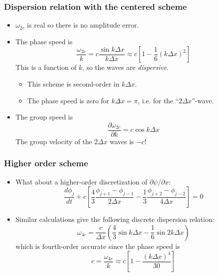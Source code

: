 \documentclass[aspectratio=43,9pt]{beamer}
\begin{document}
%
%
\begin{frame}
	\frametitle{Dispersion relation with the centered scheme}
	\vfill\begin{itemize}
		\item $\omega_{2c}$ is real so there is no amplitude error.\vfill
		\item The phase speed is
			\begin{equation*}
				\frac{\omega_{2c}}{k} = c \frac{\sin k \Delta x}{k \Delta x}\approx c \left[1 - \frac16 (k \Delta x)^2\right]
			\end{equation*}
			This is a function of $k$, so the waves are \emph{dispersive}.
			\begin{itemize}
				\item This scheme is second-order in $k \Delta x$.
				\item The phase speed is zero for $k\Delta x = \pi$, i.e. for the ``$2 \Delta x$''-wave.
			\end{itemize}\vfill
		\item The group speed is
			\begin{equation*}
				\frac{\partial \omega_{2c}}{\partial k} = c \cos k \Delta x
			\end{equation*}
			The group velocity of the $2 \Delta x$ waves is $-c$!
	\end{itemize}\vfill
\end{frame}
%
%
\begin{frame}
	\frametitle{Higher order scheme}
	\vfill\begin{itemize}
		\item What about a higher-order discretization of $\partial\psi/\partial x$:
			\begin{equation*}
				\frac{d \phi_j}{dt} + c \left[ \frac43 \frac{\phi_{j+1} - \phi_{j-1}}{2 \Delta x} 
					- \frac13 \frac{\phi_{j+2} - \phi_{j-2}}{4 \Delta x} \right] = 0
			\end{equation*}\vfill
		\item Similar calculations give the following discrete dispersion relation:
			\begin{equation*}
				\omega_{4c} = \frac{c}{\Delta x} \left( \frac43 \sin k \Delta x -    \frac16 \sin 2 k \Delta x \right)
			\end{equation*}
			which is fourth-order accurate since the phase speed is
			\begin{equation*}
				c = \frac{\omega_{4c}}{k} \approx c \left[ 1 - \frac{( k \Delta x)^4}{30} \right]
			\end{equation*}
	\end{itemize}\vfill
\end{frame}
\end{document}
